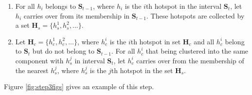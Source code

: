 \begin{enumerate}
\def\labelenumi{(\alph{enumi})}
\item
  For all \(h_i\) belongs to \(\boldsymbol{S}_{t-1}\), where \(h_i\) is
  the \(i\)th hotspot in the interval \(\boldsymbol{S}_{t}\), let
  \(h_i\) carries over from its membership in \(\boldsymbol{S}_{t-1}\).
  These hotspots are collected by a set
  \(\boldsymbol{H}_s = \{h_s^1,h_s^2,...\}\).
\item
  Let \(\boldsymbol{H}_c = \{h_c^1,h_c^2,...\}\), where \(h_c^i\) is the
  \(i\)th hotspot in set \(\boldsymbol{H}_c\) and all \(h_c^i\) belong
  to \(\boldsymbol{S}_t\) but do not belong to \(\boldsymbol{S}_{t-1}\).
  For all \(h_c^i\) that being clustered into the same component with
  \(h_s^j\) in interval \(\boldsymbol{S}_t\), let \(h_c^i\) carries over
  from the membership of the nearest \(h_s^j\), where \(h_s^j\) is the
  \(j\)th hotspot in the set \(\boldsymbol{H}_s\).
\end{enumerate}

Figure \ref{fig:step3figs} gives an example of this step.


